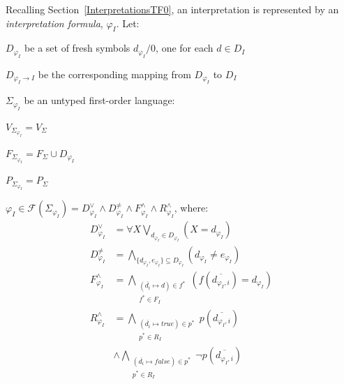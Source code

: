 \documentclass[letterpaper]{article}
\newenvironment{packed_itemize}{
\vspace*{-0.2em}
\begin{itemize}
\setlength{\partopsep}{0pt}
\setlength{\itemsep}{1pt}
\setlength{\parskip}{0pt}
\setlength{\parsep}{0pt}
}{\end{itemize}}
\newcommand{\true}{{\mathit{true}}}
\newcommand{\false}{{\mathit{false}}}
\begin{document}
\noindent
Recalling Section~\ref{InterpretationsTF0}, an interpretation is represented by an 
{\em interpretation formula}, $\varphi_I$.
Let:
\begin{packed_itemize}
\item $D_{\varphi_I}$ be a set of fresh symbols $d_{\varphi_I}/0$, one for each $d \in D_I$
\item $D_{\varphi_I \rightarrow I}$ be the corresponding mapping from $D_{\varphi_I}$ to $D_I$
\item $\Sigma_{\varphi_I}$ be an untyped first-order language:
      \begin{packed_itemize}
      \item $V_{\Sigma_{\varphi_I}} = V_\Sigma$
      \item $F_{\Sigma_{\varphi_I}} = F_\Sigma \cup D_{\varphi_I}$
      \item $P_{\Sigma_{\varphi_I}} = P_\Sigma$
      \end{packed_itemize}
\item $\varphi_I \in \mathcal{F}(\Sigma_{\varphi_I}) = 
D^\vee_{\varphi_I} \land D^{\neq}_{\varphi_I} \land F^\wedge_{\varphi_I} \land 
R^\wedge_{\varphi_I}$, where:
\begin{equation*}
\begin{split}
D^\vee_{\varphi_I}   &= \forall X \bigvee_{d_{\varphi_I} \in D_{\varphi_I}} \left(X = d_{\varphi_I} \right) \\
D^{\neq}_{\varphi_I} &= \bigwedge_{\{d_{\varphi_I},e_{\varphi_I}\} \subseteq D_{\varphi_I}} \left(d_{\varphi_I} \neq e_{\varphi_I} \right) \\
F^\wedge_{\varphi_I} &= \bigwedge_{\substack{(\overline{d_i} \mapsto d) \in f^* \\ 
                                             f^* \in F_I}} ( f(\overline{d_{\varphi_I,i}}) = d_{\varphi_I} ) \\
R^\wedge_{\varphi_I} &= \bigwedge_{\substack{(\overline{d_i} \mapsto \true) \in p^* \\
                                             p^* \in R_I}} p(\overline{d_{\varphi_I,i}}) \\
                     &\wedge \bigwedge_{\substack{(\overline{d_i} \mapsto \false) \in p^* \\
                                             p^* \in R_I}} \neg p(\overline{d_{\varphi_I,i}})
\end{split}
\end{equation*}
\end{packed_itemize}
\end{document}
